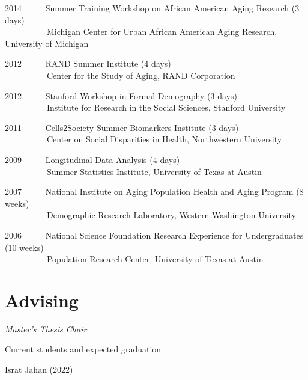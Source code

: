 \documentclass[11pt,]{article}
\begin{document}
2014 ~ ~ ~ Summer Training Workshop on African American Aging Research
(3 days)\\
\hspace*{0.333em} ~ ~ ~ ~ ~ ~ Michigan Center for Urban African American
Aging Research, University of Michigan

2012 ~ ~ ~ RAND Summer Institute (4 days)\\
\hspace*{0.333em} ~ ~ ~ ~ ~ ~ Center for the Study of Aging, RAND
Corporation

2012 ~ ~ ~ Stanford Workshop in Formal Demography (3 days)\\
\hspace*{0.333em} ~ ~ ~ ~ ~ ~ Institute for Research in the Social
Sciences, Stanford University

2011 ~ ~ ~ Cells2Society Summer Biomarkers Institute (3 days)\\
\hspace*{0.333em} ~ ~ ~ ~ ~ ~ Center on Social Disparities in Health,
Northwestern University

2009 ~ ~ ~ Longitudinal Data Analysis (4 days)\\
\hspace*{0.333em} ~ ~ ~ ~ ~ ~ Summer Statistics Institute, University of
Texas at Austin

2007 ~ ~ ~ National Institute on Aging Population Health and Aging
Program (8 weeks)\\
\hspace*{0.333em} ~ ~ ~ ~ ~ ~ Demographic Research Laboratory, Western
Washington University

2006 ~ ~ ~ National Science Foundation Research Experience for
Undergraduates (10 weeks)\\
\hspace*{0.333em} ~ ~ ~ ~ ~ ~ Population Research Center, University of
Texas at Austin

\hypertarget{advising}{%
\section{Advising}\label{advising}}

\emph{Master's Thesis Chair}

\setlength{\leftskip}{0.5cm}

Current students and expected graduation

\setlength{\leftskip}{0pt}
\setlength{\leftskip}{1cm}

Israt Jahan (2022)
\end{document}
